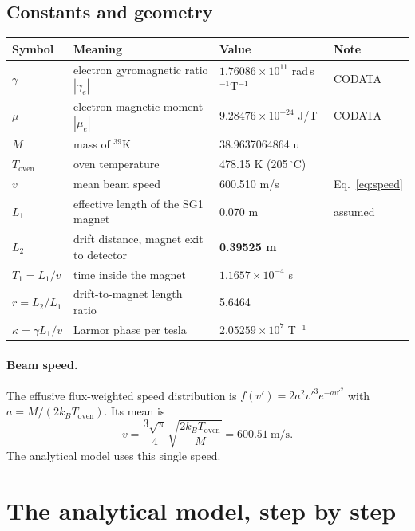 \documentclass[11pt,a4paper]{article}
\begin{document}
\subsection{Constants and geometry}
\begin{center}
\small
\begin{tabular}{llll}
\toprule
Symbol & Meaning & Value & Note\\
\midrule
$\gamma$ & electron gyromagnetic ratio $|\gamma_e|$ & $1.76086\times10^{11}$ rad\,s$^{-1}$T$^{-1}$ & CODATA\\
$\mu$    & electron magnetic moment $|\mu_e|$ & $9.28476\times10^{-24}$ J/T & CODATA\\
$M$      & mass of $^{39}$K & 38.9637064864 u & \\
$T_\text{oven}$ & oven temperature & 478.15 K (205\,$^\circ$C) & \\
$v$      & mean beam speed & 600.510 m/s & Eq.~\eqref{eq:speed}\\
$L_1$    & effective length of the SG1 magnet & 0.070 m & assumed\\
$L_2$    & drift distance, magnet exit to detector & \textbf{0.39525 m} & \\
\midrule
$T_1 = L_1/v$ & time inside the magnet & $1.1657\times10^{-4}$ s & \\
$r = L_2/L_1$ & drift-to-magnet length ratio & 5.6464 & \\
$\kappa = \gamma L_1/v$ & Larmor phase per tesla & $2.05259\times10^{7}$ T$^{-1}$ & \\
\bottomrule
\end{tabular}
\end{center}

\paragraph{Beam speed.} The effusive flux-weighted speed distribution is $f(v') = 2a^2v'^3e^{-av'^2}$ with $a = M/(2k_BT_\text{oven})$. Its mean is
\begin{equation}
v = \frac{3\sqrt{\pi}}{4}\sqrt{\frac{2k_BT_\text{oven}}{M}} = 600.51\ \text{m/s}.
\label{eq:speed}
\end{equation}
The analytical model uses this single speed.

\section{The analytical model, step by step}
\end{document}
